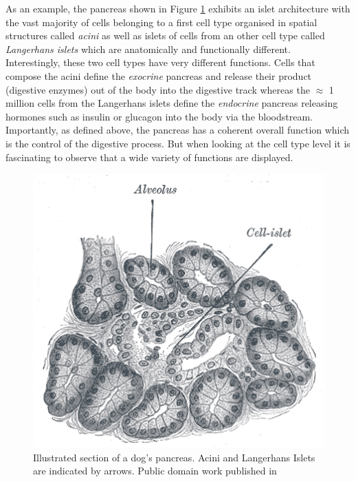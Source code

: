         
     As an example, the pancreas shown in Figure \ref{fig:pancreas} exhibits an islet architecture \cite{brissova05} with the vast majority of cells belonging to a first cell type organised in spatial structures called \emph{acini} as well as islets of cells from an other cell type called \emph{Langerhans islets} which are anatomically and functionally different.\\
     
      Interestingly, these two cell types have very different functions. Cells that compose the acini define the \emph{exocrine} pancreas and release their product (digestive enzymes) out of the body into the digestive track \cite{rodriguez11} whereas the $\approx$ 1 million cells \cite{hellman09} from the Langerhans islets define the \emph{endocrine} pancreas releasing hormones such as insulin or glucagon into the body via the bloodstream. Importantly, as defined above, the pancreas has a coherent overall function which is the control of the digestive process. But when looking at the cell type level it is fascinating to observe that a wide variety of functions are displayed.\\
     
\begin{figure}[bth]
\begin{center}
  \includegraphics[width=0.8\linewidth]{gfx/chapter1/pancreas.png}
\end{center}
  \caption{Illustrated section of a dog's pancreas. Acini and Langerhans Islets are indicated by arrows. Public domain work published in \cite{williams80}}
  \label{fig:pancreas}
\end{figure}
    
